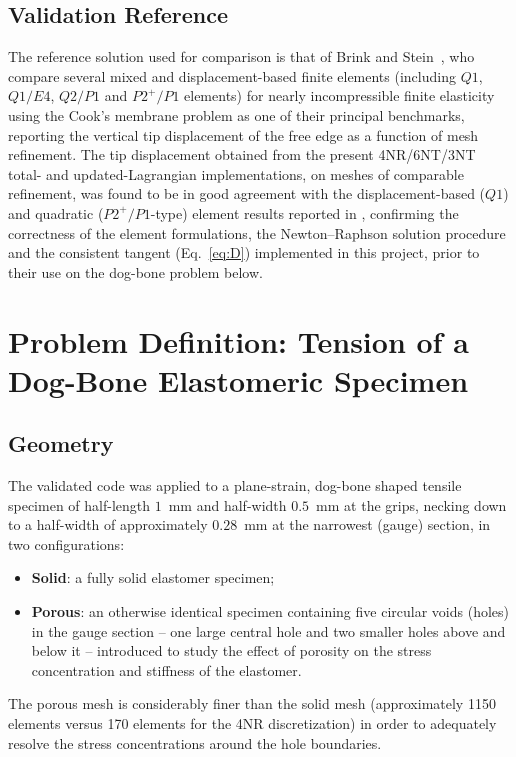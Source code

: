 \documentclass[11pt,a4paper]{article}
\begin{document}
\subsection{Validation Reference}
The reference solution used for comparison is that of Brink and Stein~\cite{brinkstein1996}, who compare
several mixed and displacement-based finite elements (including $Q1$, $Q1/E4$, $Q2/P1$ and $P2^{+}/P1$
elements) for nearly incompressible finite elasticity using the Cook's membrane problem as one of their
principal benchmarks, reporting the vertical tip displacement of the free edge as a function of mesh
refinement. The tip displacement obtained from the present 4NR/6NT/3NT total- and updated-Lagrangian
implementations, on meshes of comparable refinement, was found to be in good agreement with the
displacement-based ($Q1$) and quadratic ($P2^{+}/P1$-type) element results reported in
\cite{brinkstein1996}, confirming the correctness of the element formulations, the Newton--Raphson solution
procedure and the consistent tangent (Eq.~\eqref{eq:D}) implemented in this project, prior to their use on
the dog-bone problem below.

\section{Problem Definition: Tension of a Dog-Bone Elastomeric Specimen}
\label{sec:problem}

\subsection{Geometry}
The validated code was applied to a plane-strain, dog-bone shaped tensile specimen of half-length $1$~mm
and half-width $0.5$~mm at the grips, necking down to a half-width of approximately $0.28$~mm at the
narrowest (gauge) section, in two configurations:
\begin{itemize}
    \item \textbf{Solid}: a fully solid elastomer specimen;
    \item \textbf{Porous}: an otherwise identical specimen containing five circular voids (holes) in the
    gauge section -- one large central hole and two smaller holes above and below it -- introduced to study
    the effect of porosity on the stress concentration and stiffness of the elastomer.
\end{itemize}
The porous mesh is considerably finer than the solid mesh (approximately 1150 elements versus 170 elements
for the 4NR discretization) in order to adequately resolve the stress concentrations around the hole
boundaries.
\end{document}
